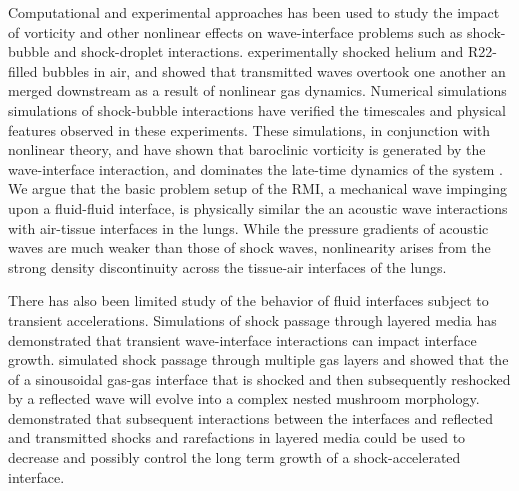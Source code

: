 Computational and experimental approaches has been used to study the
impact of vorticity and other nonlinear effects on wave-interface
problems such as shock-bubble and shock-droplet
interactions. \cite{Haast1987} experimentally shocked helium and
R22-filled bubbles in air, and showed that transmitted waves overtook
one another an merged downstream as a result of nonlinear gas
dynamics. Numerical simulations simulations of shock-bubble
interactions have verified the timescales and physical features
observed in these experiments. These simulations, in conjunction with
nonlinear theory, and have shown that baroclinic vorticity is
generated by the wave-interface interaction, and dominates the
late-time dynamics of the system \citep{Picone1988,Quirk1996}. We
argue that the basic problem setup of the \ac{RMI}, a mechanical wave
impinging upon a fluid-fluid interface, is physically similar the an
acoustic wave interactions with air-tissue interfaces in the
lungs. While the pressure gradients of acoustic waves are much weaker
than those of shock waves, nonlinearity arises from the strong density
discontinuity across the tissue-air interfaces of the lungs.

There has also been limited study of the behavior of fluid interfaces
subject to transient accelerations. Simulations of shock passage
through layered media has demonstrated that transient wave-interface
interactions can impact interface growth. \cite{Mikaelian1996}
simulated shock passage through multiple gas layers and showed that
the of a sinousoidal gas-gas interface that is shocked and then
subsequently reshocked by a reflected wave will evolve into a complex
nested mushroom morphology. \cite{HenrydeFrahan2015b} demonstrated
that subsequent interactions between the interfaces and reflected and
transmitted shocks and rarefactions in layered media could be used to
decrease and possibly control the long term growth of a
shock-accelerated interface.

